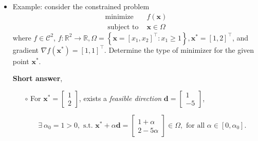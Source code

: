 \documentclass[12pt,thmsa]{article}
\begin{document}
\begin{itemize}
	
	\item Example: consider the constrained problem
	\[
	\begin{array}{rl}
		\operatorname{minimize} & f(\boldsymbol{x}) \\
		\text { subject to } & \boldsymbol{x} \in \Omega
	\end{array}
	\]where \(f \in \mathcal{C}^{2} \), \(f: \mathbb{R}^{2} \rightarrow \mathbb{R}, \Omega=\left\{\boldsymbol{x}=\left[x_{1}, x_{2}\right]^{\top}: x_{1} \geq 1\right\}, \boldsymbol{x}^{*}=[1,2]^{\top} \), and gradient \(\nabla f\left(\boldsymbol{x}^{*}\right)=[1,1]^{\top} \). Determine the type of minimizer for the given point \(\boldsymbol{x}^{*}\).
	
	\textbf{Short answer},
	
	\begin{itemize}
		\item[\(\circ\)] For \(\boldsymbol{x}^* = \begin{bmatrix} 1 \\ 2 \end{bmatrix}\), exists a \textit{feasible direction} \(\boldsymbol{d} = \begin{bmatrix} 1 \\ -5 \end{bmatrix}\),
	
		\[
		\exists \ \alpha_{0} = 1 > 0, \text{ s.t. } \boldsymbol{x}^* + \alpha \boldsymbol{d} = \begin{bmatrix} 1+\alpha \\ 2-5\alpha \end{bmatrix} \in \Omega, \text{ for all } \alpha \in\left[0, \alpha_{0}\right]. 
		\]
	

\end{itemize}
\end{itemize}
\end{document}
